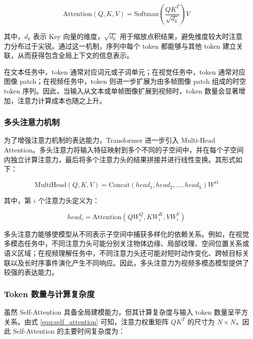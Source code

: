 \begin{equation}
    \label{equ:self_attention}
    \mathrm{Attention}(Q,K,V)=\mathrm{Softmax}\left(\frac{QK^{T}}{\sqrt{d_k}}\right)V
\end{equation}

其中，$d_k$ 表示 Key 向量的维度，$\sqrt{d_k}$ 用于缩放点积结果，避免维度较大时注意力分布过于尖锐。通过这一机制，序列中每个 token 都能够与其他 token 建立关联，从而获得包含全局上下文的信息表示。

在文本任务中，token 通常对应词元或子词单元；在视觉任务中，token 通常对应图像 patch；在视频任务中，token 则进一步扩展为由多帧图像 patch 组成的时空 token 序列。因此，当输入从文本或单帧图像扩展到视频时，token 数量会显著增加，注意力计算成本也随之上升。

\subsubsection{多头注意力机制}

为了增强注意力机制的表达能力，Transformer 进一步引入 Multi-Head Attention。多头注意力将输入特征映射到多个不同的子空间中，并在每个子空间内独立计算注意力，最后将多个注意力头的结果拼接并进行线性变换。其形式如下：

\begin{equation}
    \label{equ:multi_head_attention}
    \mathrm{MultiHead}(Q,K,V)=\mathrm{Concat}(head_1,head_2,\dots,head_h)W^O
\end{equation}

其中，第 $i$ 个注意力头定义为：

\begin{equation}
    \label{equ:attention_head}
    head_i=\mathrm{Attention}(QW_i^Q,KW_i^K,VW_i^V)
\end{equation}

多头注意力能够使模型从不同表示子空间中捕获多样化的依赖关系。例如，在视觉多模态任务中，不同注意力头可能分别关注物体边缘、局部纹理、空间位置关系或语义区域；在视频理解任务中，不同注意力头还可能对短时动作变化、跨帧目标关联以及长时序事件演化产生不同响应。因此，多头注意力为视频多模态模型提供了较强的表达能力。

\subsubsection{Token 数量与计算复杂度}

虽然 Self-Attention 具备全局建模能力，但其计算复杂度与输入 token 数量呈平方关系。由式 \ref{equ:self_attention} 可知，注意力权重矩阵 $QK^T$ 的尺寸为 $N\times N$，因此 Self-Attention 的主要时间复杂度为：

